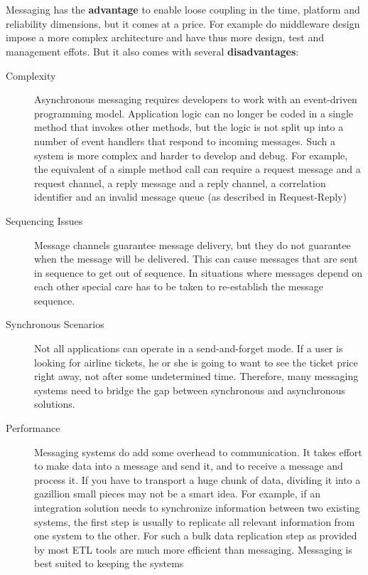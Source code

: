 \documentclass[../Main.tex]{subfiles}
\begin{document}
\\\\
Messaging has the \textbf{advantage} to enable loose coupling in the time, platform and reliability dimensions, but it comes at a price.
For example do middleware design impose a more complex architecture and have thus more design, test and management effots.
But it also comes with several \textbf{disadvantages}:
\begin{description}
    \item[Complexity] Asynchronous messaging requires developers to work with an event-driven programming model. 
    Application logic can no longer be coded in a single method that invokes other methods, but the logic is 
    not split up into a number of event handlers that respond to incoming messages. Such a system is more 
    complex and harder to develop and debug. For example, the equivalent of a simple method call can 
    require a request message and a request channel, a reply message and a reply channel, a correlation 
    identifier and an invalid message queue (as described in Request-Reply)
    \item[Sequencing Issues] Message channels guarantee message delivery, but they do not guarantee when the message will be 
    delivered. This can cause messages that are sent in sequence to get out of sequence. In situations 
    where messages depend on each other special care has to be taken to re-establish the message 
    sequence.
    \item[Synchronous Scenarios] Not all applications can operate in a send-and-forget mode. If a user is looking for airline 
    tickets, he or she is going to want to see the ticket price right away, not after some 
    undetermined time. Therefore, many messaging systems need to bridge the gap between 
    synchronous and asynchronous solutions.
    \item[Performance] Messaging systems do add some overhead to communication. It takes effort to make data 
    into a message and send it, and to receive a message and process it. If you have to 
    transport a huge chunk of data, dividing it into a gazillion small pieces may not be a smart 
    idea. For example, if an integration solution needs to synchronize information between two 
    existing systems, the first step is usually to replicate all relevant information from one 
    system to the other. For such a bulk data replication step as provided by most ETL tools 
    are much more efficient than messaging. Messaging is best suited to keeping the systems 

\end{description}
\end{document}
